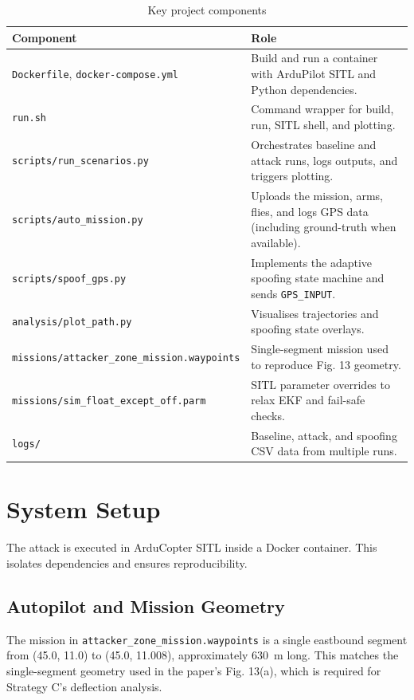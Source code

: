 \documentclass[12pt, a4paper]{article}
\begin{document}
\begin{table}[H]
  \centering
  \begin{tabularx}{\textwidth}{lX}
    \toprule
    \textbf{Component} & \textbf{Role} \\
    \midrule
    \texttt{Dockerfile}, \texttt{docker-compose.yml} & Build and run a container with ArduPilot SITL and Python dependencies. \\
    \texttt{run.sh} & Command wrapper for build, run, SITL shell, and plotting. \\
    \texttt{scripts/run\_scenarios.py} & Orchestrates baseline and attack runs, logs outputs, and triggers plotting. \\
    \texttt{scripts/auto\_mission.py} & Uploads the mission, arms, flies, and logs GPS data (including ground-truth when available). \\
    \texttt{scripts/spoof\_gps.py} & Implements the adaptive spoofing state machine and sends \texttt{GPS\_INPUT}. \\
    \texttt{analysis/plot\_path.py} & Visualises trajectories and spoofing state overlays. \\
    \texttt{missions/attacker\_zone\_mission.waypoints} & Single-segment mission used to reproduce Fig. 13 geometry. \\
    \texttt{missions/sim\_float\_except\_off.parm} & SITL parameter overrides to relax EKF and fail-safe checks. \\
    \texttt{logs/} & Baseline, attack, and spoofing CSV data from multiple runs. \\
    \bottomrule
  \end{tabularx}
  \caption{Key project components}
  \label{tab:repo}
\end{table}

\section{System Setup}

The attack is executed in ArduCopter SITL inside a Docker container. This isolates dependencies and ensures reproducibility.

\subsection{Autopilot and Mission Geometry}
The mission in \texttt{attacker\_zone\_mission.waypoints} is a single eastbound segment from (45.0, 11.0) to (45.0, 11.008), approximately 630~m long. This matches the single-segment geometry used in the paper's Fig. 13(a), which is required for Strategy C's deflection analysis.
\end{document}
